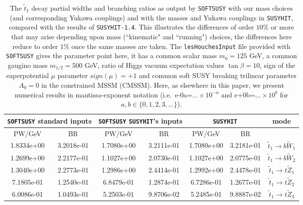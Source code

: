 \documentclass[final,3p,times]{elsarticle}
\begin{document}
\begin{center}
\begin{table}
\centering
\begin{tabular}{|c|c|c|c|c|c|c|} \hline
\multicolumn{2}{|c|}{{\tt SOFTSUSY} standard inputs} & \multicolumn{2}{c|}{{\tt SOFTSUSY} {\tt SUSYHIT}'s inputs} & \multicolumn{2}{c|}{{\tt SUSYHIT}} & mode \\ \hline
PW/GeV & BR & PW/GeV & BR & PW/GeV & BR &  \\ \hline
1.8334e+00 & 3.2018e-01 & 1.7080e+00 & 3.2111e-01 & 1.7080e+00 & 3.2181e-01 & $\tilde{t}_1 \rightarrow b \tilde{W}_1$ \\ \hline
1.2699e+00 & 2.2177e-01 & 1.1027e+00 & 2.0730e-01 & 1.1027e+00 & 2.0775e-01 & $\tilde{t}_1 \rightarrow b \tilde{W}_2$ \\ \hline
1.3040e+00 & 2.2773e-01 & 1.2986e+00 & 2.4414e-01 & 1.2992e+00 & 2.4478e-01 & $\tilde{t}_1 \rightarrow t \tilde{Z}_1$ \\ \hline
7.1805e-01 & 1.2540e-01 & 6.8479e-01 & 1.2874e-01 & 6.7286e-01 & 1.2677e-01 & $\tilde{t}_1 \rightarrow t \tilde{Z}_2$ \\ \hline
6.0086e-01 & 1.0493e-01 & 5.2503e-01 & 9.8706e-02 & 5.2485e-01 & 9.8887e-02 & $\tilde{t}_1 \rightarrow t \tilde{Z}_3$ \\ \hline
\end{tabular}
\caption{The $\tilde{t}_1$ decay partial widths and branching ratios as output
  by {\tt SOFTSUSY} with our mass choices (and corresponding Yukawa couplings) and 
  with the masses and Yukawa couplings in {\tt SUSYHIT}, compared with the results of
  {\tt SUSYHIT-1.4}. This illustrates the differences of order $10\%$ or more
  that may arise depending upon mass (``kinematic" and ``running") choices,
  the differences here reduce to order $1\%$ once the same masses are taken. 
  The {\tt lesHouchesInput} file provided with {\tt SOFTSUSY} gives the parameter
  point here, it has a common scalar mass $m_0 = 125$ GeV, a common gaugino
  mass $m_{1/2} = 500$ GeV, ratio of Higgs vacuum expectation values 
  $\tan\beta = 10$, sign of the superpotential $\mu$ parameter $sign(\mu) = +1$
  and common soft SUSY breaking trilinear parameter $A_0 = 0$ in the
  constrained MSSM (CMSSM).  
Here, as elsewhere in this paper,
  we present numerical results in mantissa-exponent notation (i.e.\ e-0a=$\ldots \times 10^{-a}$
  and e+0b=$\ldots \times 10^b$ for $a,b \in \{0,1,2,3, \ldots\}$).} 
\label{stop1table}
\end{table}
\end{center}
\end{document}
